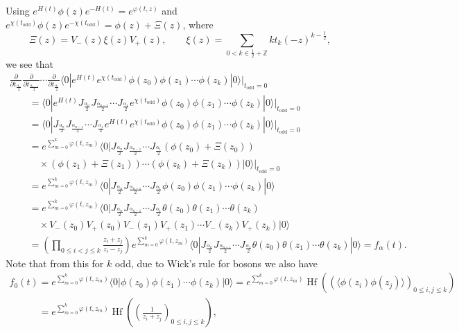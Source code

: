 \documentclass[pdftex]{sigma}
\numberwithin{equation}{section}
\newcommand{\Hf}{\mathop\mathrm{Hf}\nolimits}
\begin{document}
Using $e^{H(t)}\phi(z)e^{-H(t)}=e^{\varphi(t,z)}$ and
$ e^{\chi(t_\mathrm{odd})}\phi(z)e^{-\chi(t_\mathrm{odd})}=\phi(z)+\Xi(z)
$,
where
\[
\Xi(z)=V_-(z)\xi(z)V_+(z) , \qquad
\xi(z)=\sum_{0<k\in \frac12+\mathbb{Z}}
k t_k(- z)^{{k}-\frac{1}{2}} ,
\]
we see that
\begin{gather*}
 \frac{\partial}{\partial
t_{\frac{\alpha_n}2}} \frac{\partial}{\partial t_{\frac{\alpha_{n-1}}2}}
\cdots \frac{\partial}{\partial t_{\frac{\alpha_1}2}}\langle 0|
e^{H(t)}e^{\chi(t_\mathrm{odd})}\phi(z_0)\phi(z_1)\cdots\phi(z_{k})
|0\rangle\biggr|_{t_\mathrm{odd}=0}  \\
\qquad{} = \langle
0|e^{H(t)} J_{\frac{\alpha_n}{2}}J_{\frac{\alpha_{n-1}}{2}}
\cdots J_{\frac{\alpha_{1}}{2}}
e^{\chi(t_\mathrm{odd})}\phi(z_0)\phi(z_1)\cdots\phi(z_{k})
|0\rangle\bigr|_{t_\mathrm{odd}=0}\\
\qquad{} =\langle
0|J_{\frac{\alpha_n}{2}}J_{\frac{\alpha_{n-1}}{2}}
\cdots J_{\frac{\alpha_{1}}{2}}
e^{H(t)}e^{\chi(t_\mathrm{odd})}\phi(z_0)\phi(z_1)\cdots\phi(z_{k})
|0\rangle\bigr|_{t_\mathrm{odd}=0}\\
\qquad{} = e^{\sum\limits_{m=0}^k \varphi(t,z_m)}  \langle
0|J_{\frac{\alpha_n}{2}}J_{\frac{\alpha_{n-1}}{2}}
\cdots J_{\frac{\alpha_{1}}{2}}\left(\phi(z_0)+\Xi(z_0)\right)\\
\qquad\quad{}\times
\left(\phi(z_1)+\Xi(z_1)\right)
\cdots\left(\phi(z_{k})+\Xi(z_k)\right)
|0\rangle\bigr|_{t_\mathrm{odd}=0}\\
\qquad{} =e^{\sum\limits_{m=0}^k \varphi(t,z_m)} \langle
0|J_{\frac{\alpha_n}{2}}J_{\frac{\alpha_{n-1}}{2}}
\cdots J_{\frac{\alpha_{1}}{2}} \phi(z_0)\phi(z_1)
\cdots\phi(z_{k})
|0\rangle\\
\qquad{} = e^{\sum\limits_{m=0}^k \varphi(t,z_m)}
 \langle
0|J_{\frac{\alpha_n}{2}}J_{\frac{\alpha_{n-1}}{2}}
\cdots J_{\frac{\alpha_{1}}{2}} \theta(z_{0}) \theta(z_1)
\cdots\theta(z_{k})\\
\qquad\quad{}\times
 V_-(z_0)V_+(z_0)V_-(z_1)V_+(z_1)\cdots
V_-(z_k)V_+(z_k)
|0\rangle\\
\qquad{}  =\left(\prod_{0\le i<j\le k}\frac{z_i+{z_j}}{z_i-{z_j}}\right)
e^{\sum\limits_{m=0}^k \varphi(t,z_m)} \langle
0|J_{\frac{\alpha_n}{2}}J_{\frac{\alpha_{n-1}}{2}}
\cdots J_{\frac{\alpha_{1}}{2}} \theta(z_{0}) \theta(z_1)
\cdots\theta(z_{k})
|0\rangle
 =f_\alpha(t) .
\end{gather*}
Note that from this for $k$ odd, due to Wick's rule for bosons we also have
\begin{gather*}
f_0(t) = e^{\sum\limits_{m=0}^k \varphi(t,z_m)} \langle 0|
\phi(z_0)\phi(z_1) \cdots\phi(z_{k})
|0\rangle =e^{\sum\limits_{m=0}^k \varphi(t,z_m)} \Hf \left(\left(\langle
\phi(z_i)\phi(z_j)\rangle
\right)_{0\le i,j\le k}\right)\\
\phantom{f_0(t)}{} =e^{\sum\limits_{m=0}^k \varphi(t,z_m)}
\Hf\left(\left(\frac{1}{z_i+z_j}\right)_{0\le i,j\le k}\right),
\end{gather*}
\end{document}
